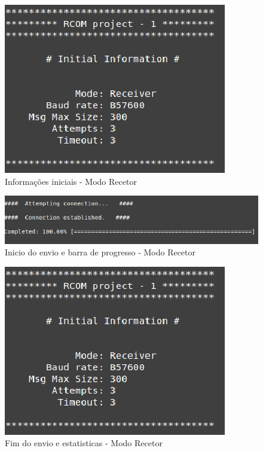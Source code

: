 \documentclass[11pt]{article}
\begin{document}
\begin{figure}[h!]
\begin{center}
\includegraphics[scale=0.6]{rec1.png}
\caption{Informações iniciais - Modo Recetor}
\label{fig:codigoFigura}
\end{center}
\end{figure}

\begin{figure}[h!]
\begin{center}
\includegraphics[scale=0.6]{rec2.png}
\caption{Inicio do envio e barra de progresso - Modo Recetor}
\label{fig:codigoFigura}
\end{center}
\end{figure}

\begin{figure}[h!]
\begin{center}
\includegraphics[scale=0.65]{rec1.png}
\caption{Fim do envio e estatisticas - Modo Recetor}
\label{fig:codigoFigura}
\end{center}
\end{figure}
\end{document}
